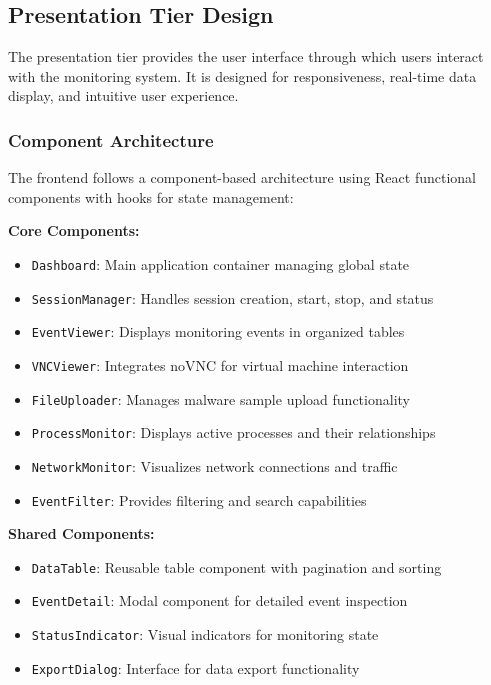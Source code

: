 \subsection{Presentation Tier Design}

The presentation tier provides the user interface through which users interact with the monitoring system. It is designed for responsiveness, real-time data display, and intuitive user experience.

\subsubsection{Component Architecture}

The frontend follows a component-based architecture using React functional components with hooks for state management:

\textbf{Core Components:}
\begin{itemize}
    \item \texttt{Dashboard}: Main application container managing global state
    \item \texttt{SessionManager}: Handles session creation, start, stop, and status
    \item \texttt{EventViewer}: Displays monitoring events in organized tables
    \item \texttt{VNCViewer}: Integrates noVNC for virtual machine interaction
    \item \texttt{FileUploader}: Manages malware sample upload functionality
    \item \texttt{ProcessMonitor}: Displays active processes and their relationships
    \item \texttt{NetworkMonitor}: Visualizes network connections and traffic
    \item \texttt{EventFilter}: Provides filtering and search capabilities
\end{itemize}

\textbf{Shared Components:}
\begin{itemize}
    \item \texttt{DataTable}: Reusable table component with pagination and sorting
    \item \texttt{EventDetail}: Modal component for detailed event inspection
    \item \texttt{StatusIndicator}: Visual indicators for monitoring state
    \item \texttt{ExportDialog}: Interface for data export functionality
\end{itemize}

